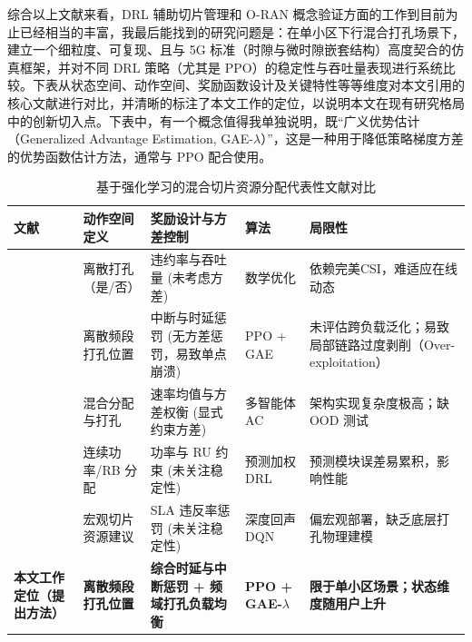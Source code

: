 综合以上文献来看，DRL 辅助切片管理和 O-RAN 概念验证方面的工作到目前为止已经相当的丰富，我最后能找到的研究问题是：在单小区下行混合打孔场景下，建立一个细粒度、可复现、且与 5G 标准（时隙与微时隙嵌套结构）高度契合的仿真框架，并对不同 DRL 策略（尤其是 PPO）的稳定性与吞吐量表现进行系统比较。下表从状态空间、动作空间、奖励函数设计及关键特性等等维度对本文引用的核心文献进行对比，并清晰的标注了本文工作的定位，以说明本文在现有研究格局中的创新切入点。下表中，有一个概念值得我单独说明，既“广义优势估计（Generalized Advantage Estimation, GAE-$\lambda$）”，这是一种用于降低策略梯度方差的优势函数估计方法，通常与 PPO 配合使用。
\begin{table}[htbp]
\centering
\small
\setlength{\tabcolsep}{4pt}
\caption{基于强化学习的混合切片资源分配代表性文献对比}
\label{tab:literature_comparison}
\renewcommand{\arraystretch}{1.3}
\begin{tabularx}{\textwidth}{@{}>{\raggedright\arraybackslash}p{}>{\raggedright\arraybackslash}p{}>{\raggedright\arraybackslash}X>{\raggedright\arraybackslash}p{}>{\raggedright\arraybackslash}X@{}}
\toprule
\textbf{文献} & \textbf{动作空间定义} & \textbf{奖励设计与方差控制} & \textbf{算法} & \textbf{局限性} \\
\midrule
\cite{anand2020} & 离散打孔（是/否） & 违约率与吞吐量 \newline (未考虑方差) & 数学优化 & 依赖完美CSI，难适应在线动态 \\
\cite{saggese2021} & 离散频段打孔位置 & 中断与时延惩罚 \newline (无方差惩罚，易致单点崩溃) & PPO + GAE & 未评估跨负载泛化；易致局部链路过度剥削（Over-exploitation） \\
\cite{alsenwi2024distributed} & 混合分配与打孔 & 速率均值与方差权衡 \newline (显式约束方差) & 多智能体 AC & 架构实现复杂度极高；缺 OOD 测试 \\
\cite{cai2024} & 连续功率/RB 分配 & 功率与 RU 约束 \newline (未关注稳定性) & 预测加权 DRL & 预测模块误差易累积，影响性能 \\
\cite{dai2025} & 宏观切片资源建议 & SLA 违反率惩罚 \newline (未关注稳定性) & 深度回声 DQN & 偏宏观部署，缺乏底层打孔物理建模 \\
\textbf{本文工作定位（提出方法）} & \textbf{离散频段打孔位置} & \textbf{综合时延与中断惩罚 + 频域打孔负载均衡} & \textbf{PPO + \newline GAE-$\lambda$} & \textbf{限于单小区场景；状态维度随用户上升} \\
\bottomrule
\end{tabularx}
\end{table}

